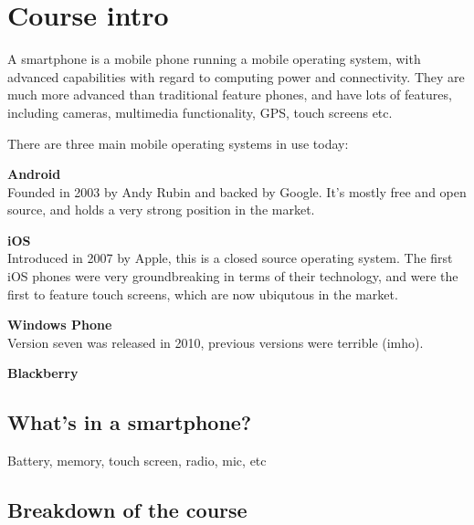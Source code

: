 
\section{Course intro}

A smartphone is a mobile phone running a mobile operating system, with advanced
capabilities with regard to computing power and connectivity. They are much more
advanced than traditional feature phones, and have lots of features, including
cameras, multimedia functionality, GPS, touch screens etc.

There are three main mobile operating systems in use today:

\begin{description}

  \item \textbf{Android}\\
  	Founded in 2003 by Andy Rubin and backed by Google. It's mostly free and
  	open source, and holds a very strong position in the market.
  \item \textbf{iOS}\\
  	Introduced in 2007 by Apple, this is a closed source operating system. The
  	first iOS phones were very groundbreaking in terms of their technology, and
  	were the first to feature touch screens, which are now ubiqutous in the
  	market.
  \item \textbf{Windows Phone}\\
    Version seven was released in 2010, previous versions were terrible (imho).
  \item \textbf{Blackberry}\\
\end{description}

\subsection{What's in a smartphone?}

Battery, memory, touch screen, radio, mic, etc

\subsection{Breakdown of the course}


